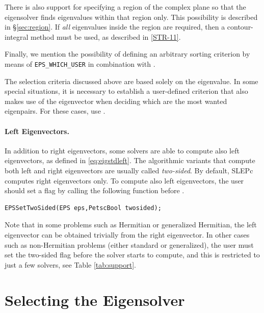 
There is also support for specifying a region of the complex plane so that the eigensolver finds eigenvalues within that region only. This possibility is described in \S\ref{sec:region}. If \emph{all} eigenvalues inside the region are required, then a contour-integral method must be used, as described in \hyperlink{str}{[STR-11]}.

Finally, we mention the possibility of defining an arbitrary sorting criterion by means of \texttt{EPS\_WHICH\_USER} in combination with .

The selection criteria discussed above are based solely on the eigenvalue. In some special situations, it is necessary to establish a user-defined criterion that also makes use of the eigenvector when deciding which are the most wanted eigenpairs. For these cases, use .

\paragraph{Left Eigenvectors.}

In addition to right eigenvectors, some solvers are able to compute also left eigenvectors, as defined in \eqref{eq:eigstdleft}. The algorithmic variants that compute both left and right eigenvectors are usually called \emph{two-sided}. By default, SLEPc computes right eigenvectors only. To compute also left eigenvectors, the user should set a flag by calling the following function before .
        \begin{Verbatim}[fontsize=\small]
        EPSSetTwoSided(EPS eps,PetscBool twosided);
        \end{Verbatim}
Note that in some problems such as Hermitian or generalized Hermitian, the left eigenvector can be obtained trivially from the right eigenvector. In other cases such as non-Hermitian problems (either standard or generalized), the user must set the two-sided flag before the solver starts to compute, and this is restricted to just a few solvers, see Table \ref{tab:support}.

\section{Selecting the Eigensolver}

